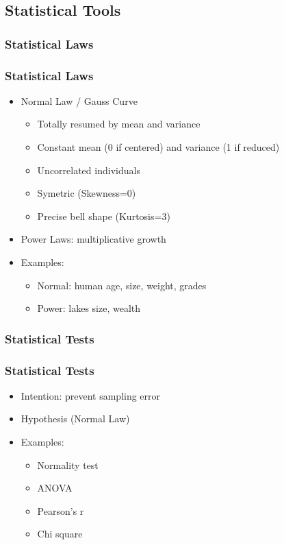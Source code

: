 \subsection{Statistical Tools}

\subsubsection{Statistical Laws}

\begin{frame}\frametitle{Statistical Laws}
   \begin{itemize}
      \item Normal Law / Gauss Curve
      \begin{itemize}
         \item Totally resumed by mean and variance
         \item Constant mean (0 if centered) and variance (1 if reduced)
         \item Uncorrelated individuals
         \item Symetric (Skewness=0)
         \item Precise bell shape (Kurtosis=3)
      \end{itemize}

      \item Power Laws: multiplicative growth
      \item Examples:
      \begin{itemize}
         \item Normal: human age, size, weight, grades
         \item Power: lakes size, wealth
      \end{itemize}
   \end{itemize}
\end{frame}


\subsubsection{Statistical Tests}

\begin{frame}\frametitle{Statistical Tests}
   \begin{itemize}
      \item Intention: prevent sampling error
      \item Hypothesis (Normal Law)
      \item Examples:
      \begin{itemize}
         \item Normality test
         \item ANOVA
         \item Pearson's r
         \item Chi square
      \end{itemize}
   \end{itemize}
\end{frame}



